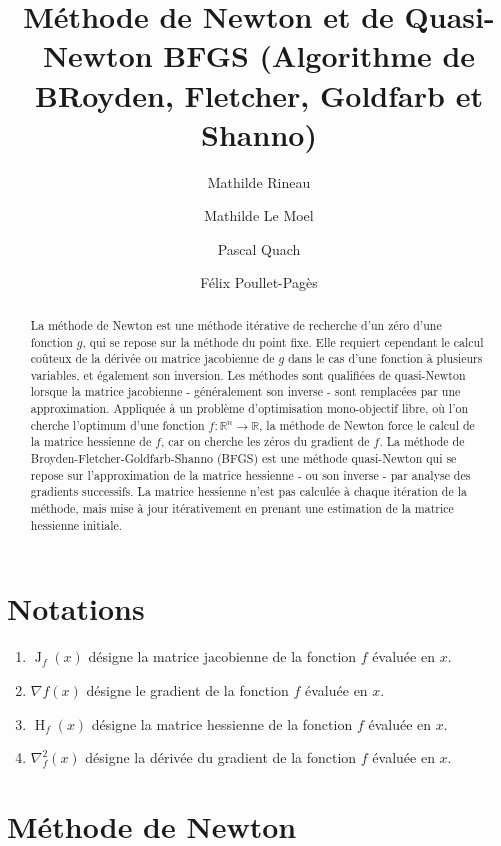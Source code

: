 \documentclass[3p, twocolumn]{elsarticle}
\DeclareMathOperator{\Hessian}{H}
\DeclareMathOperator{\Jacobian}{J}
\begin{document}
\nocite{arxiv:kovalev2019stochastic}
\begin{frontmatter}
    \title{Méthode de Newton et de Quasi-Newton BFGS (Algorithme de BRoyden, Fletcher, Goldfarb et Shanno)}
    \author{Mathilde Rineau}
    \author{Mathilde Le Moel}
    \author{Pascal Quach}
    \author{Félix Poullet-Pagès}

    \begin{abstract}
        La méthode de Newton est une méthode itérative de recherche d'un zéro d'une fonction $g$, qui se repose sur la méthode du point fixe. Elle requiert cependant le calcul coûteux de la dérivée ou matrice jacobienne de $g$ dans le cas d'une fonction à plusieurs variables, et également son inversion. Les méthodes sont qualifiées de quasi-Newton lorsque la matrice jacobienne - généralement son inverse - sont remplacées par une approximation. Appliquée à un problème d'optimisation mono-objectif libre, où l'on cherche l'optimum d'une fonction $f:\mathbb{R}^n\rightarrow \mathbb{R}$, la méthode de Newton force le calcul de la matrice hessienne de $f$, car on cherche les zéros du gradient de $f$. La méthode de Broyden-Fletcher-Goldfarb-Shanno (BFGS) est une méthode quasi-Newton qui se repose sur l'approximation de la matrice hessienne - ou son inverse - par analyse des gradients successifs. La matrice hessienne n'est pas calculée à chaque itération de la méthode, mais mise à jour itérativement en prenant une estimation de la matrice hessienne initiale.
    \end{abstract}
\end{frontmatter}

\cleardoublepage
\tableofcontents

\cleardoublepage
\section{Notations}
\begin{enumerate}
    \item $\Jacobian_{f}(x)$ désigne la matrice jacobienne de la fonction $f$ évaluée en $x$.
    \item $\nabla f(x)$ désigne le gradient de la fonction $f$ évaluée en $x$.
    \item $\Hessian_{f}(x)$ désigne la matrice hessienne de la fonction $f$ évaluée en $x$.
    \item $\nabla^2_{f}(x)$ désigne la dérivée du gradient de la fonction $f$ évaluée en $x$.
\end{enumerate}

\section{Méthode de Newton}
\end{document}
